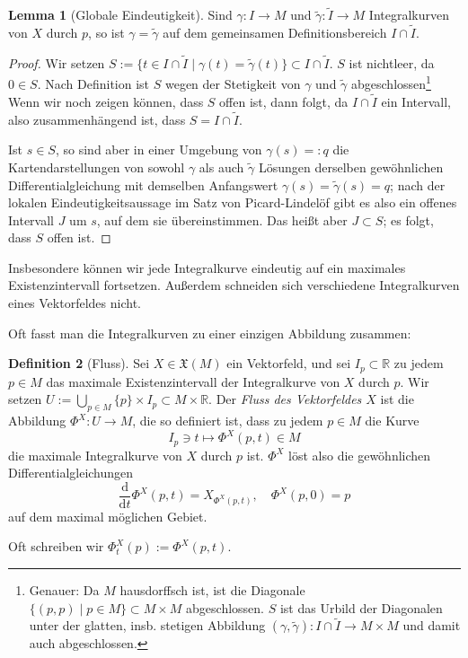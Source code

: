 \documentclass[a4paper]{scrbook}
\numberwithin{equation}{chapter}
\newcommand{\D}{\mathrm{d}}
\newcommand{\R}{\mathbb{R}}
\theoremstyle{definition}
\newtheorem{defn}{Definition}[section]
\newtheorem{lemma}[defn]{Lemma}
\begin{document}
\begin{lemma}[Globale Eindeutigkeit]
	Sind $\gamma\colon I \to M$ und $\tilde\gamma\colon \tilde I \to M$ Integralkurven von $X$ durch $p$, so ist $\gamma = \tilde \gamma$ auf dem gemeinsamen Definitionsbereich $I \cap \tilde I$.

	\begin{proof}
		Wir setzen $S := \{t \in I \cap \tilde I \mid \gamma(t) = \tilde \gamma(t)\} \subset I \cap \tilde I$. $S$ ist nichtleer, da $0 \in S$. Nach Definition ist $S$ wegen der Stetigkeit von $\gamma$ und $\tilde \gamma$ abgeschlossen\footnote{Genauer: Da $M$ hausdorffsch ist, ist die Diagonale $\{(p,p) \mid p \in M\} \subset M \times M$ abgeschlossen. $S$ ist das Urbild der Diagonalen unter der glatten, insb. stetigen Abbildung $(\gamma,\tilde \gamma) \colon I \cap \tilde I \to M \times M$ und damit auch abgeschlossen.} Wenn wir noch zeigen können, dass $S$ offen ist, dann folgt, da $I \cap \tilde I$ ein Intervall, also zusammenhängend ist, dass $S = I \cap \tilde I$.

		Ist $s \in S$, so sind aber in einer Umgebung von $\gamma(s) =: q$ die Kartendarstellungen von sowohl $\gamma$ als auch $\tilde \gamma$ Lösungen derselben gewöhnlichen Differentialgleichung mit demselben Anfangswert $\gamma(s) = \tilde\gamma(s) = q$; nach der lokalen Eindeutigkeitsaussage im Satz von Picard-Lindelöf gibt es also ein offenes Intervall $J$ um $s$, auf dem sie übereinstimmen. Das heißt aber $J \subset S$; es folgt, dass $S$ offen ist.
	\end{proof}
\end{lemma}
Insbesondere können wir jede Integralkurve eindeutig auf ein maximales Existenzintervall fortsetzen. Außerdem schneiden sich verschiedene Integralkurven eines Vektorfeldes nicht.

Oft fasst man die Integralkurven zu einer einzigen Abbildung zusammen:
\begin{defn}[Fluss]
	Sei $X \in \mathfrak X(M)$ ein Vektorfeld, und sei $I_p \subset \R$ zu jedem $p \in M$ das maximale Existenzintervall der Integralkurve von $X$ durch $p$. Wir setzen $U := \bigcup_{p\in M} \{p\}\times I_p \subset M \times \R$. Der \emph{Fluss des Vektorfeldes $X$} ist die Abbildung $\Phi^X\colon U \to M$, die so definiert ist, dass zu jedem $p \in M$ die Kurve
	\[I_p \ni t \mapsto \Phi^X(p,t) \in M\]
	die maximale Integralkurve von $X$ durch $p$ ist. $\Phi^X$ löst also die gewöhnlichen Differentialgleichungen
	\[\frac{\D}{\D t} \Phi^X(p,t) = X_{\Phi^X(p,t)}, \quad \Phi^X(p,0) = p\]
	auf dem maximal möglichen Gebiet.

	Oft schreiben wir $\Phi^X_t(p) := \Phi^X(p,t)$.
\end{defn}
\end{document}
